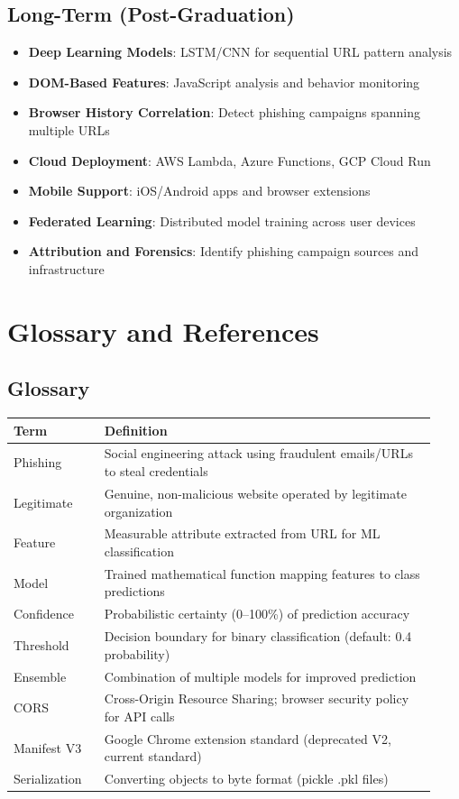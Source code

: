 \documentclass[12pt,a4paper]{report}
\begin{document}
\section{Long-Term (Post-Graduation)}

\begin{itemize}[leftmargin=*]
    \item \textbf{Deep Learning Models}: LSTM/CNN for sequential URL pattern analysis
    \item \textbf{DOM-Based Features}: JavaScript analysis and behavior monitoring
    \item \textbf{Browser History Correlation}: Detect phishing campaigns spanning multiple URLs
    \item \textbf{Cloud Deployment}: AWS Lambda, Azure Functions, GCP Cloud Run
    \item \textbf{Mobile Support}: iOS/Android apps and browser extensions
    \item \textbf{Federated Learning}: Distributed model training across user devices
    \item \textbf{Attribution and Forensics}: Identify phishing campaign sources and infrastructure
\end{itemize}

\chapter{Glossary and References}

\section{Glossary}

\begin{longtable}{p{0.20\linewidth}p{0.73\linewidth}}
\toprule
\textbf{Term} & \textbf{Definition} \\
\midrule
Phishing & Social engineering attack using fraudulent emails/URLs to steal credentials \\
Legitimate & Genuine, non-malicious website operated by legitimate organization \\
Feature & Measurable attribute extracted from URL for ML classification \\
Model & Trained mathematical function mapping features to class predictions \\
Confidence & Probabilistic certainty (0--100\%) of prediction accuracy \\
Threshold & Decision boundary for binary classification (default: 0.4 probability) \\
Ensemble & Combination of multiple models for improved prediction \\
CORS & Cross-Origin Resource Sharing; browser security policy for API calls \\
Manifest V3 & Google Chrome extension standard (deprecated V2, current standard) \\
Serialization & Converting objects to byte format (pickle .pkl files) \\
\bottomrule
\end{longtable}
\end{document}

